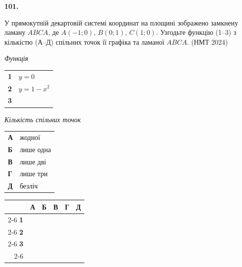 \documentclass[14pt]{extarticle}
\newcommand{\answerGrid}{
    \begingroup
    \renewcommand{\arraystretch}{1.3} 
    \setlength{\tabcolsep}{7pt} 
    \begin{tabular}{r|c|c|c|c|c|}
         \multicolumn{1}{c}{} & \multicolumn{1}{c}{\textbf{А}} & \multicolumn{1}{c}{\textbf{Б}} & \multicolumn{1}{c}{\textbf{В}} & \multicolumn{1}{c}{\textbf{Г}} & \multicolumn{1}{c}{\textbf{Д}} \\ \cline{2-6}
         \textbf{1} & & & & & \\ \cline{2-6}
         \textbf{2} & & & & & \\ \cline{2-6}
         \textbf{3} & & & & & \\ \cline{2-6}
    \end{tabular}
    \endgroup
}
\newcommand{\matchingLayout}[3]{
    \noindent
    \begin{minipage}[t]{0.40\textwidth}
       
        #1
    \end{minipage}%
    \hfill
    \begin{minipage}[t]{0.28\textwidth}
        
        #2
    \end{minipage}%
    \hfill
    \begin{minipage}[t]{0.30\textwidth}
        \vspace{0pt} %
        \begin{flushright}
        #3
        \end{flushright}
    \end{minipage}
}
\newcommand{\nmtyear}[1]{\hfill{\small\color{yearcolor}(НМТ #1)}}
\begin{document}
\noindent\textbf{101.} \begin{minipage}[t]{0.55\textwidth}
У прямокутній декартовій системі координат на площині зображено замкнену ламану $ABCA$, де $A(-1; 0)$, $B(0; 1)$, $C(1; 0)$. Узгодьте функцію (1--3) з кількістю (А--Д) спільних точок її графіка та ламаної $ABCA$.
 \nmtyear{2024}
\end{minipage}
\hfill
\begin{minipage}[t]{0.4\textwidth}
    \vspace{-0.5cm}
    \begin{flushright}
    \end{flushright}
\end{minipage}

\vspace{0.3cm}

\matchingLayout{
    \textit{Функція} \par \vspace{0.2cm}
    \begin{tabular}{@{}p{0.5cm} l@{}}
    \textbf{1} & $y=0$ \\[0.4cm]
    \textbf{2} & $y=1-x^2$ \\[0.4cm]
    \textbf{3} & \trigStyle{$y=\cos x$} \\
    \end{tabular}
}{
    \textit{Кількість спільних точок} \par \vspace{0.2cm}
    \begin{tabular}{@{}p{0.5cm} l@{}}
    \textbf{А} & жодної \\[0.2cm]
    \textbf{Б} & лише одна \\[0.2cm]
    \textbf{В} & лише дві \\[0.2cm]
    \textbf{Г} & лише три \\[0.2cm]
    \textbf{Д} & безліч \\
    \end{tabular}
}{
    \answerGrid
}
\end{document}
